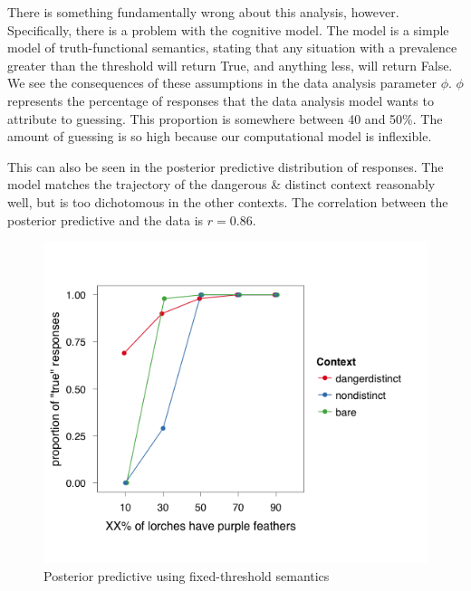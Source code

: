 \documentclass[10pt,letterpaper]{article}
\begin{document}
There is something fundamentally wrong about this analysis, however. Specifically, there is a problem with the cognitive model. The model is a simple model of truth-functional semantics, stating that any situation with a prevalence greater than the threshold will return True, and anything less, will return False. We see the consequences of these assumptions in the data analysis parameter $\phi$. $\phi$ represents the percentage of responses that the data analysis model wants to attribute to guessing. This proportion is somewhere between 40 and 50\%. The amount of guessing is so high because our computational model is inflexible.




This can also be seen in the posterior predictive distribution of responses. The model matches the trajectory of the dangerous \& distinct context reasonably well, but is too dichotomous in the other contexts. The correlation between the posterior predictive and the data is $r = 0.86$. 

\begin{figure}
\centering
    \includegraphics[width=\columnwidth]{fig3_bda1_postpred}
    \caption{Posterior predictive using fixed-threshold semantics}
  \label{fig:bda1posteriorpred}
\end{figure}





\end{document}
